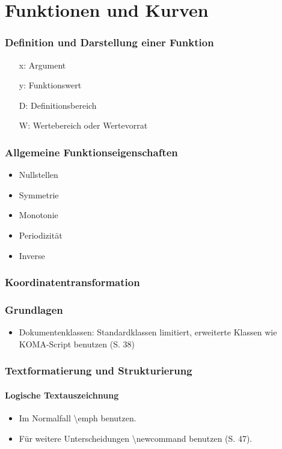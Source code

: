 \documentclass[12pt,a4paper]{article}
\begin{document}
\part{Funktionen und Kurven}

\section{Definition und Darstellung einer Funktion}
\begin{itemize}
  \item[x:] Argument
  \item[y:] Funktionswert
  \item[D:] Definitionsbereich
  \item[W:] Wertebereich oder Wertevorrat
\end{itemize}

\section{Allgemeine Funktionseigenschaften}
\begin{itemize}
  \item Nullstellen
  \item Symmetrie
  \item Monotonie
  \item Periodizität
  \item Inverse
\end{itemize}

\section{Koordinatentransformation}


\section{Grundlagen}

\begin{itemize}
\item
Dokumentenklassen: Standardklassen limitiert, erweiterte Klassen wie KOMA-Script
benutzen (S. 38)
\end{itemize}

\section{Textformatierung und Strukturierung}

\subsection{Logische Textauszeichnung}
\begin{itemize}
\item
Im Normalfall \textbackslash emph benutzen.
\item
Für weitere Unterscheidungen \textbackslash newcommand benutzen (S. 47).
\end{itemize}
\end{document}
